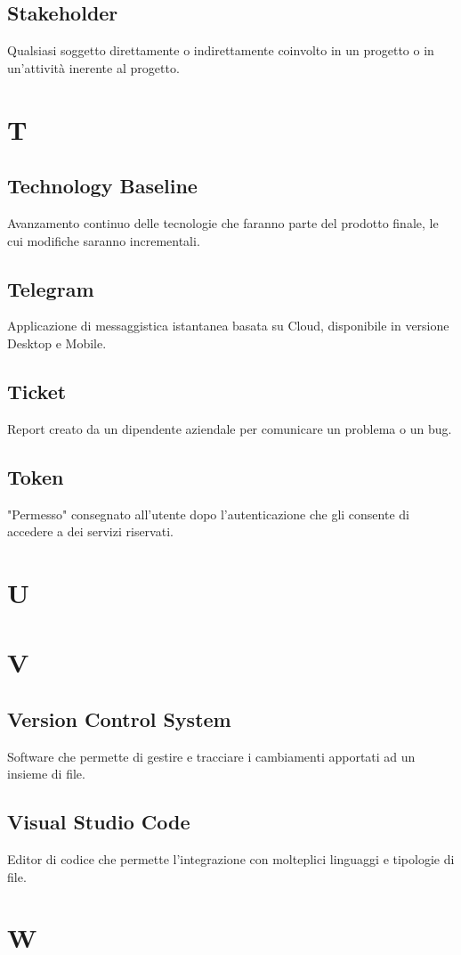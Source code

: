 \subsection{Stakeholder}
Qualsiasi soggetto direttamente o indirettamente coinvolto in un progetto o in un'attività inerente al progetto.
\newpage
\section{T}
\subsection{Technology Baseline}
Avanzamento continuo delle tecnologie che faranno parte del prodotto finale, le cui modifiche saranno incrementali.
\subsection{Telegram}
Applicazione di messaggistica istantanea basata su Cloud, disponibile in versione Desktop e Mobile.
\subsection{Ticket}
Report creato da un dipendente aziendale per comunicare un problema o un bug.
\subsection{Token}  
"Permesso" consegnato all'utente dopo l'autenticazione che gli consente di accedere a dei servizi riservati.
\newpage
\section{U}
\section{V}
\subsection{Version Control System}
Software che permette di gestire e tracciare i cambiamenti apportati ad un insieme di file.
\subsection{Visual Studio Code}
Editor di codice che permette l'integrazione con molteplici linguaggi e tipologie di file.
\newpage
\section{W}
